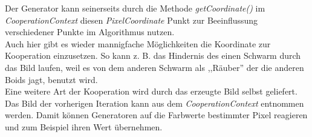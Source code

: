 \documentclass[../mciAusarbeitung.tex]{subfiles}
\begin{document}
	Der Generator kann seinerseits durch die Methode \textit{getCoordinate()} im \textit{CooperationContext} diesen \textit{PixelCoordinate} Punkt zur Beeinflussung verschiedener Punkte im Algorithmus nutzen.\\
	Auch hier gibt es wieder mannigfache Möglichkeiten die Koordinate zur Kooperation einzusetzen. So kann z. B. das Hindernis des einen Schwarm durch das Bild laufen, weil es von dem anderen Schwarm als ,,Räuber'' der die anderen Boids jagt, benutzt wird.\\
	Eine weitere Art der Kooperation wird durch das erzeugte Bild selbst geliefert. Das Bild der vorherigen Iteration kann aus dem \textit{CooperationContext} entnommen werden. Damit können Generatoren auf die Farbwerte bestimmter Pixel reagieren und zum Beispiel ihren Wert übernehmen.
	
	
\end{document}
